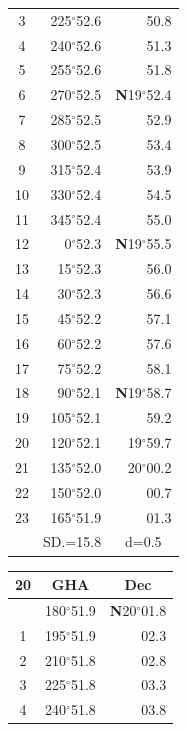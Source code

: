 \documentclass[10pt, a4paper]{report}
\begin{document}
\begin{scriptsize}
\begin{tabular*}{0.2\textwidth}[t]{@{\extracolsep{\fill}}|c|rr|}
3 & 225$^\circ$52.6 & \raisebox{0.24ex}{\boldmath$\cdot$~\boldmath$\cdot$~~}50.8\\
4 & 240$^\circ$52.6 & 51.3\\
5 & 255$^\circ$52.6 & 51.8\\[2Pt]
6 & 270$^\circ$52.5 & \textbf{N}19$^\circ$52.4\\
7 & 285$^\circ$52.5 & 52.9\\
8 & 300$^\circ$52.5 & 53.4\\
9 & 315$^\circ$52.4 & \raisebox{0.24ex}{\boldmath$\cdot$~\boldmath$\cdot$~~}53.9\\
10 & 330$^\circ$52.4 & 54.5\\
11 & 345$^\circ$52.4 & 55.0\\[2Pt]
12 & 0$^\circ$52.3 & \textbf{N}19$^\circ$55.5\\
13 & 15$^\circ$52.3 & 56.0\\
14 & 30$^\circ$52.3 & 56.6\\
15 & 45$^\circ$52.2 & \raisebox{0.24ex}{\boldmath$\cdot$~\boldmath$\cdot$~~}57.1\\
16 & 60$^\circ$52.2 & 57.6\\
17 & 75$^\circ$52.2 & 58.1\\[2Pt]
18 & 90$^\circ$52.1 & \textbf{N}19$^\circ$58.7\\
19 & 105$^\circ$52.1 & 59.2\\
20 & 120$^\circ$52.1 & 19$^\circ$59.7\\
21 & 135$^\circ$52.0 & 20$^\circ$00.2\\
22 & 150$^\circ$52.0 & 00.7\\
23 & 165$^\circ$51.9 & 01.3\\
\hline
\rule{0pt}{2.4ex} & \multicolumn{1}{c}{SD.=15.8} & \multicolumn{1}{c|}{d=0.5}\\
\hline
\end{tabular*}\noindent
\begin{tabular*}{0.2\textwidth}[t]{@{\extracolsep{\fill}}|c|rr|}
\hline
\multicolumn{1}{|c|}{\rule{0pt}{2.6ex}\textbf{20}} & \multicolumn{1}{c}{\textbf{GHA}} & \multicolumn{1}{c|}{\textbf{Dec}}\\
\hline\rule{0pt}{2.6ex}\noindent
0 & 180$^\circ$51.9 & \textbf{N}20$^\circ$01.8\\
1 & 195$^\circ$51.9 & 02.3\\
2 & 210$^\circ$51.8 & 02.8\\
3 & 225$^\circ$51.8 & \raisebox{0.24ex}{\boldmath$\cdot$~\boldmath$\cdot$~~}03.3\\
4 & 240$^\circ$51.8 & 03.8\\

\end{tabular*}
\end{scriptsize}
\end{document}
